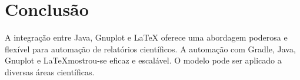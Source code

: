 \section{Conclusão}
A integração entre Java, Gnuplot e LaTeX oferece uma abordagem poderosa e flexível para automação de relatórios científicos.
A automação com Gradle, Java, Gnuplot e \LaTeX mostrou-se eficaz e escalável. O modelo pode ser aplicado a diversas áreas científicas.

